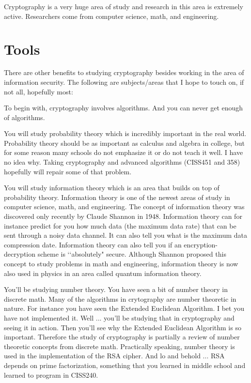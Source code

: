 Cryptography is a very huge area of study and
research in this area is extremely active.
Researchers come from computer science, math, and engineering.


\section{Tools}

There are other benefits to studying cryptography besides working
in the area of information security.
The following are subjects/areas that I hope to touch on, if not all,
hopefully most:
\begin{itemize}

  \li
  To begin with, cryptography involves algorithms.
  And you can never get enough of algorithms.

  \li
  You will study probability theory which is incredibly important in the
  real world.
  Probability theory should be as important as calculus and
  algebra in college, but for some reason many schools do not emphasize
  it or do not teach it well.
  I have no idea why.
  Taking cryptography and advanced algorithms (CISS451 and 358)
  hopefully will repair some of that problem.

  \li
  You will study information theory which is an area that builds
  on top of probability theory.
  Information theory is one of the newest areas of study in
  computer science,
  math, and engineering.
  The concept of information theory was discovered only recently by
  Claude Shannon in 1948.
  Information theory can for instance predict for you how much data
  (the maximum data rate) that can be sent through a noisy data channel.
  It can also tell you what is the maximum data compression date.
  Information theory can also tell you if an encryption-decryption
  scheme is \lq\lq absolutely" secure.
  Although Shannon proposed this concept to study
  problems in math and engineering,
  information theory is now also used in physics in an area called
  quantum information theory.

  \li
  You'll be studying number theory. 
  You have seen a bit of number theory in discrete math.
  Many of the algorithms in crytography are number theoretic in nature.
  For instance you have seen the 
  Extended Euclidean Algorithm.
  I bet you have not implemented it.
  Well ... you'll be studying that in cryptography and
  seeing it in action.
  Then you'll see why the Extended Euclidean Algorithm is so important.
  Therefore the study of cryptography is partially
  a review of number theoretic concepts from discrete math.
  Practically speaking, number theory is used in the implementation of the
  RSA cipher.
  And lo and behold ... RSA depends on prime factorization, something that
  you learned in middle school and learned to program in CISS240.
  

\end{itemize}
